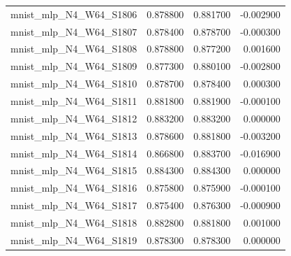 \begin{tabular}{lrrr}
mnist_mlp_N4_W64_S1806 & 0.878800 & 0.881700 & -0.002900 \\
mnist_mlp_N4_W64_S1807 & 0.878400 & 0.878700 & -0.000300 \\
mnist_mlp_N4_W64_S1808 & 0.878800 & 0.877200 & 0.001600 \\
mnist_mlp_N4_W64_S1809 & 0.877300 & 0.880100 & -0.002800 \\
mnist_mlp_N4_W64_S1810 & 0.878700 & 0.878400 & 0.000300 \\
mnist_mlp_N4_W64_S1811 & 0.881800 & 0.881900 & -0.000100 \\
mnist_mlp_N4_W64_S1812 & 0.883200 & 0.883200 & 0.000000 \\
mnist_mlp_N4_W64_S1813 & 0.878600 & 0.881800 & -0.003200 \\
mnist_mlp_N4_W64_S1814 & 0.866800 & 0.883700 & -0.016900 \\
mnist_mlp_N4_W64_S1815 & 0.884300 & 0.884300 & 0.000000 \\
mnist_mlp_N4_W64_S1816 & 0.875800 & 0.875900 & -0.000100 \\
mnist_mlp_N4_W64_S1817 & 0.875400 & 0.876300 & -0.000900 \\
mnist_mlp_N4_W64_S1818 & 0.882800 & 0.881800 & 0.001000 \\
mnist_mlp_N4_W64_S1819 & 0.878300 & 0.878300 & 0.000000 \\
\bottomrule
\end{tabular}
